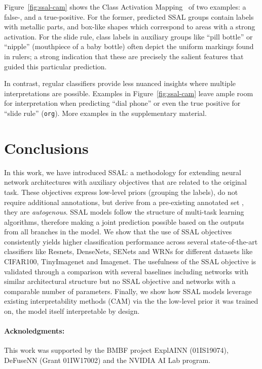 \documentclass[10pt,twocolumn,letterpaper]{article}
\begin{document}
Figure~\ref{fig:ssal-cam} shows the Class Activation Mapping~\cite{zhou2016cnnlocalization} of two examples: a false-, and a true-positive.
For the former, predicted SSAL groups contain labels with metallic parts, and box-like shapes which correspond to areas with a strong activation.
For the slide rule, class labels in auxiliary groups like ``pill bottle'' or ``nipple'' (mouthpiece of a baby bottle) often depict the uniform markings found in rulers; a strong indication that these are precisely the salient features that guided this particular prediction.

In contrast, regular classifiers provide less nuanced insights where multiple interpretations are possible.
Examples in Figure~\ref{fig:ssal-cam} leave ample room for interpretation when predicting ``dial phone'' or even the true positive for ``slide rule'' (\texttt{org}).
More examples in the supplementary material.




\section{Conclusions}
In this work, we have introduced SSAL: a methodology for extending neural network architectures with auxiliary objectives that are related to the original task.
These objectives express low-level priors (\eg grouping the labels), do not require additional annotations, but derive from a pre-existing annotated set \ie, they are \textit{autogenous}.
SSAL models follow the structure of multi-task learning algorithms, therefore making a joint prediction possible based on the outputs from all branches in the model.
We show that the use of SSAL objectives consistently yields higher classification performance across several state-of-the-art classifiers like Resnets, DenseNets, SENets and WRNs for different datasets like CIFAR100, TinyImagenet and Imagenet.
The usefulness of the SSAL objective is validated through a comparison with several baselines including networks with similar architectural structure but no SSAL objective and networks with a comparable number of parameters.
Finally, we show how SSAL models leverage existing interpretability methods (\eg CAM) via the the low-level prior it was trained on, the model itself interpretable by design.

\iffalse
\textbf{Future Work}: we are interested in measuring the effects of different clustering algorithms that can be used as grouping criterion, in particular bootstraping or EM-like strategies. Furthermore, we want to explore low-level priors other than grouping that can be conveyed in a self-supervised fashion.
Finally, we are interested in assessing the benefits of using SSAL branches for neural-architecture-search algorithms.
\fi

\paragraph{Acknoledgments:} This work was supported by the BMBF project ExplAINN (01IS19074), DeFuseNN (Grant 01IW17002) and the NVIDIA AI Lab program.

{\small


}
\end{document}
